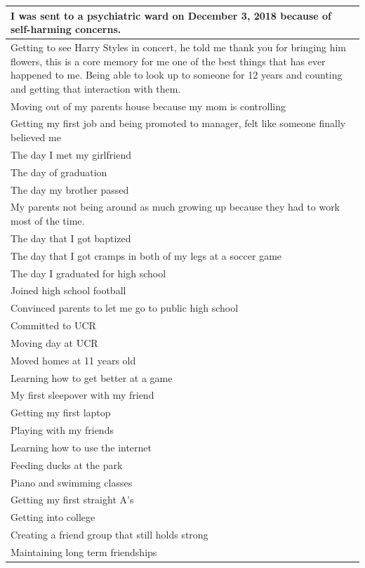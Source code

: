 \documentclass[
  .7em,
  letterpaper,
  DIV=11,
  numbers=noendperiod]{scrartcl}
\begin{document}
\begin{table}
\begin{tabular}{l}
\hline
I was sent to a psychiatric ward on December 3, 2018 because of self-harming concerns.\\
\hline
Getting to see Harry Styles in concert, he told me thank you for bringing him flowers, this is a core memory for me one of the best things that has ever happened to me. Being able to look up to someone for 12 years and counting and getting that interaction with them.\\
\hline
Moving out of my parents house because my mom is controlling\\
\hline
Getting my first job and being promoted to manager, felt like someone finally believed me\\
\hline
The day I met my girlfriend\\
\hline
The day of graduation\\
\hline
The day my brother passed\\
\hline
My parents not being around as much growing up because they had to work most of the time.\\
\hline
The day that I got baptized\\
\hline
The day that I got cramps in both of my legs at a soccer game\\
\hline
The day I graduated for high school\\
\hline
Joined high school football\\
\hline
Convinced parents to let me go to public high school\\
\hline
Committed to UCR\\
\hline
Moving day at UCR\\
\hline
Moved homes at 11 years old\\
\hline
Learning how to get better at a game\\
\hline
My first sleepover with my friend\\
\hline
Getting my first laptop\\
\hline
Playing with my friends\\
\hline
Learning how to use the internet\\
\hline
Feeding ducks at the park\\
\hline
Piano and swimming classes\\
\hline
Getting my first straight A's\\
\hline
Getting into college\\
\hline
Creating a friend group that still holds strong\\
\hline
Maintaining long term friendships\\

\end{tabular}
\end{table}
\end{document}
